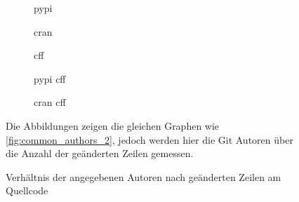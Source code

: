\begin{figure}
    \begin{subfigure}{.5\textwidth}
        \centering
        
        \caption{\gls{pypi}}
        \label{fig:common_authors_2_by_files_pypi}
    \end{subfigure}%
    \begin{subfigure}{.5\textwidth}
        \centering
        
        \caption{\gls{cran}}
        \label{fig:common_authors_2_by_files_cran}
    \end{subfigure}
    \begin{subfigure}{.5\textwidth}
        \centering
        
        \caption{\gls{cff}}
        \label{fig:common_authors_2_by_files_cff}
    \end{subfigure}%
    \begin{subfigure}{.5\textwidth}
        \centering
        
        \caption{\gls{pypi} \gls{cff}}
        \label{fig:common_authors_2_by_files_pypi_cff}
    \end{subfigure}
    \centering
    \begin{subfigure}{.5\textwidth}
        \centering
        
        \caption{\gls{cran} \gls{cff}}
        \label{fig:common_authors_2_by_files_cran_cff}
    \end{subfigure}
    \caption{Verhältnis der angegebenen Autoren nach geänderten Zeilen am Quellcode}
    \label{fig:common_authors_2_by_files}
    \small
    Die Abbildungen zeigen die gleichen Graphen wie \autoref{fig:common_authors_2}, jedoch werden hier die Git Autoren über die Anzahl der geänderten Zeilen gemessen.
\end{figure}

